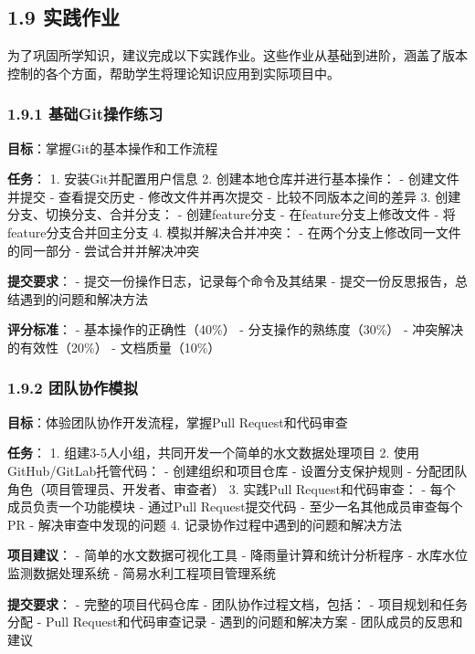 \subsection{1.9 实践作业}\label{ux5b9eux8df5ux4f5cux4e1a}

为了巩固所学知识，建议完成以下实践作业。这些作业从基础到进阶，涵盖了版本控制的各个方面，帮助学生将理论知识应用到实际项目中。

\subsubsection{1.9.1
基础Git操作练习}\label{ux57faux7840gitux64cdux4f5cux7ec3ux4e60}

\textbf{目标}：掌握Git的基本操作和工作流程

\textbf{任务}： 1. 安装Git并配置用户信息 2. 创建本地仓库并进行基本操作：
- 创建文件并提交 - 查看提交历史 - 修改文件并再次提交 -
比较不同版本之间的差异 3. 创建分支、切换分支、合并分支： -
创建feature分支 - 在feature分支上修改文件 - 将feature分支合并回主分支 4.
模拟并解决合并冲突： - 在两个分支上修改同一文件的同一部分 -
尝试合并并解决冲突

\textbf{提交要求}： - 提交一份操作日志，记录每个命令及其结果 -
提交一份反思报告，总结遇到的问题和解决方法

\textbf{评分标准}： - 基本操作的正确性（40\%） -
分支操作的熟练度（30\%） - 冲突解决的有效性（20\%） - 文档质量（10\%）

\subsubsection{1.9.2
团队协作模拟}\label{ux56e2ux961fux534fux4f5cux6a21ux62df}

\textbf{目标}：体验团队协作开发流程，掌握Pull Request和代码审查

\textbf{任务}： 1. 组建3-5人小组，共同开发一个简单的水文数据处理项目 2.
使用GitHub/GitLab托管代码： - 创建组织和项目仓库 - 设置分支保护规则 -
分配团队角色（项目管理员、开发者、审查者） 3. 实践Pull
Request和代码审查： - 每个成员负责一个功能模块 - 通过Pull
Request提交代码 - 至少一名其他成员审查每个PR - 解决审查中发现的问题 4.
记录协作过程中遇到的问题和解决方法

\textbf{项目建议}： - 简单的水文数据可视化工具 -
降雨量计算和统计分析程序 - 水库水位监测数据处理系统 -
简易水利工程项目管理系统

\textbf{提交要求}： - 完整的项目代码仓库 - 团队协作过程文档，包括： -
项目规划和任务分配 - Pull Request和代码审查记录 - 遇到的问题和解决方案 -
团队成员的反思和建议

